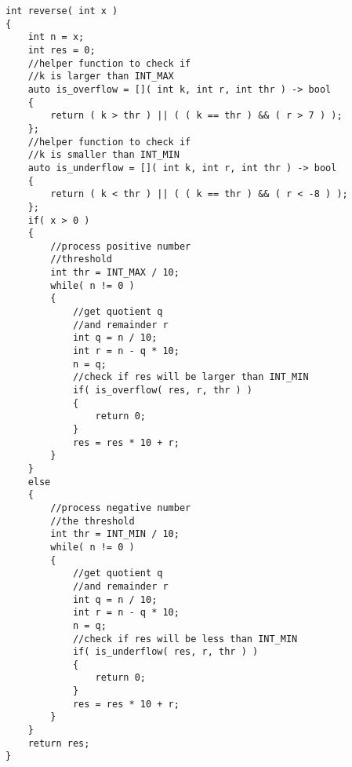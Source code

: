 \setcounter{lstlisting}{0}
\begin{lstlisting}[style=customc, caption={Check before over/underflow}]
int reverse( int x )
{
    int n = x;
    int res = 0;
    //helper function to check if
    //k is larger than INT_MAX
    auto is_overflow = []( int k, int r, int thr ) -> bool
    {
        return ( k > thr ) || ( ( k == thr ) && ( r > 7 ) );
    };
    //helper function to check if
    //k is smaller than INT_MIN
    auto is_underflow = []( int k, int r, int thr ) -> bool
    {
        return ( k < thr ) || ( ( k == thr ) && ( r < -8 ) );
    };
    if( x > 0 )
    {
        //process positive number
        //threshold
        int thr = INT_MAX / 10;
        while( n != 0 )
        {
            //get quotient q
            //and remainder r
            int q = n / 10;
            int r = n - q * 10;
            n = q;
            //check if res will be larger than INT_MIN
            if( is_overflow( res, r, thr ) )
            {
                return 0;
            }
            res = res * 10 + r;
        }
    }
    else
    {
        //process negative number
        //the threshold
        int thr = INT_MIN / 10;
        while( n != 0 )
        {
            //get quotient q
            //and remainder r
            int q = n / 10;
            int r = n - q * 10;
            n = q;
            //check if res will be less than INT_MIN
            if( is_underflow( res, r, thr ) )
            {
                return 0;
            }
            res = res * 10 + r;
        }
    }
    return res;
}
\end{lstlisting}